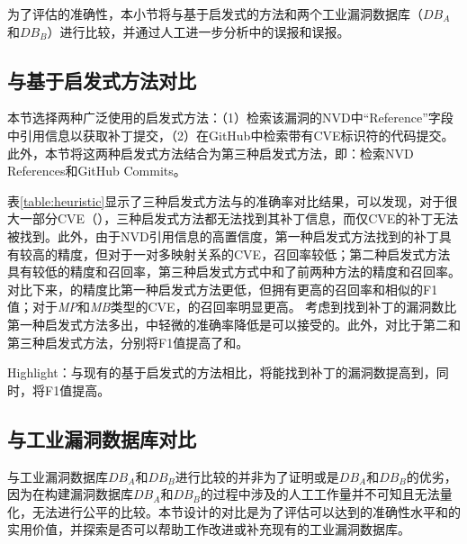 为了评估\tool 的准确性，本小节将\tool 与基于启发式的方法和两个工业漏洞数据库（$DB_A$和$DB_B$）进行比较，并通过人工进一步分析\tool 中的误报和误报。

\subsection{与基于启发式方法对比}
本节选择两种广泛使用的启发式方法：（1）检索该漏洞的NVD中“Reference”字段中引用信息以获取补丁提交\cite{duan2019automating,li2016vulpecker,li2018vuldeepecker}，（2）在GitHub中检索带有CVE标识符的代码提交\cite{you2017semfuzz,Wang2020empirical}。%
此外，本节将这两种启发式方法结合为第三种启发式方法，即：检索NVD References和GitHub Commits。

表\ref{table:heuristic}显示了三种启发式方法与\tool 的准确率对比结果，可以发现，对于很大一部分CVE（），三种启发式方法都无法找到其补丁信息，而仅CVE的补丁无法被\tool 找到。此外，由于NVD引用信息的高置信度，第一种启发式方法找到的补丁具有较高的精度，但对于一对多映射关系的CVE，召回率较低；第二种启发式方法具有较低的精度和召回率，第三种启发式方式中和了前两种方法的精度和召回率。对比下来，\tool 的精度比第一种启发式方法更低，但拥有更高的召回率和相似的F1值；对于\textit{MP}和\textit{MB}类型的CVE，\tool 的召回率明显更高。%
考虑到\tool 找到补丁的漏洞数比第一种启发式方法多出，\tool 中轻微的准确率降低是可以接受的。此外，对比于第二和第三种启发式方法，\tool 分别将F1值提高了和。

\begin{tcolorbox}[size=title,opacityfill=0.15]
Highlight：与现有的基于启发式的方法相比，\tool 将能找到补丁的漏洞数提高到，同时，将F1值提高。
\end{tcolorbox}


\subsection{与工业漏洞数据库对比}
与工业漏洞数据库$DB_A$和$DB_B$进行比较的并非为了证明\tool 或是$DB_A$和$DB_B$的优劣，因为在构建漏洞数据库$DB_A$和$DB_B$的过程中涉及的人工工作量并不可知且无法量化，无法进行公平的比较。本节设计的对比是为了评估\tool 可以达到的准确性水平和\tool 的实用价值，并探索\tool 是否可以帮助工作改进或补充现有的工业漏洞数据库。

